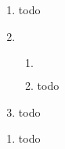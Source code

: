 \documentclass[ngerman]{fbi-aufgabenblatt}
\begin{document}
\begin{enumerate}
	\item
	todo
	\item
	\begin{enumerate}
	
	\item 
	$ $\\
	\begin{blockgraph}{28}{1}{0.4}

	
	\end{blockgraph}
	
	\item
	todo
	\end{enumerate}
	
	\item
	todo
\end{enumerate}


\begin{enumerate}
	\item
	todo
\end{enumerate}
\end{document}
